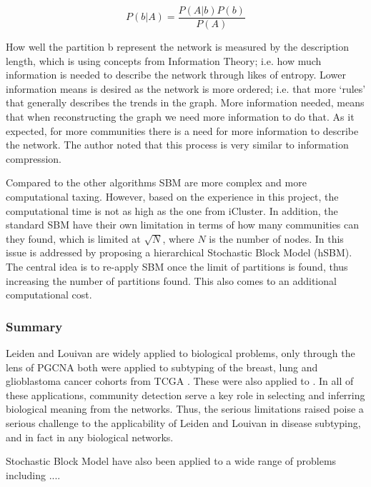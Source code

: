 \begin{equation} \label{eq:sbm}
         P(b|A) = \frac{P(A|b)P(b)}{P(A)}
\end{equation}

How well the partition b represent the network is measured by the description length, which is using concepts from Information Theory; i.e. how much information is needed to describe the network through likes of entropy. Lower information means is desired as the network is more ordered; i.e. that more ‘rules’ that generally describes the trends in the graph. More information needed, means that  when reconstructing the graph we need more information to do that. As it expected, for more communities there is a need for more information to describe the network. The author noted that this process is very similar to information compression.

Compared to the other algorithms SBM are more complex and more computational taxing. However, based on the experience in this project, the computational time is not as high as the one from iCluster\citet{Mo2013-zi}. In addition, the standard SBM\citet{Peixoto2019-fg, Peixoto2017-gc, Peixoto2017-ua, Karrer2011-si} have their own limitation in terms of how many communities can they found, which is limited at $\sqrt{N}$, where $N$ is the number of nodes. In \citet{Peixoto2014-yb} this issue is addressed by proposing a hierarchical Stochastic Block Model (hSBM). The central idea is to re-apply SBM once the limit of partitions is found, thus increasing the number of partitions found. This also comes to an additional computational cost.

\subsubsection{Summary}


Leiden and Louivan are widely applied to biological problems, only through the lens of PGCNA both were applied to subtyping of the breast, lung and glioblastoma cancer cohorts from TCGA \cite{Tanner2023-wa, Care2019-ij}. These were also applied to \citet{}. In all of these applications, community detection serve a key role in selecting and inferring biological meaning from the networks. Thus, the serious limitations raised \citet{Peixoto2021-jx,Guimera2004-gv, Peixoto2023-rt.} poise a serious challenge to the applicability of Leiden and Louivan in disease subtyping, and in fact in any biological networks. 

Stochastic Block Model have also been applied to a wide range of problems including .... \citet{}

